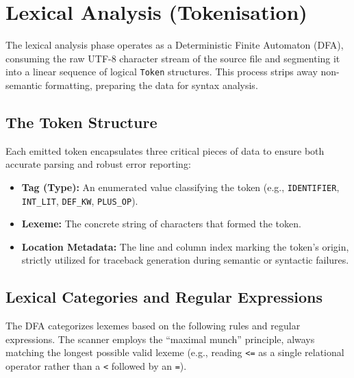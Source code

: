 \documentclass[11pt, a4paper]{article}
\begin{document}
\section{Lexical Analysis (Tokenisation)}

\noindent
The lexical analysis phase operates as a Deterministic Finite Automaton (DFA), consuming the raw UTF-8 character stream of the source file and segmenting it into a linear sequence of logical \texttt{Token} structures. This process strips away non-semantic formatting, preparing the data for syntax analysis.

\subsection{The Token Structure}

Each emitted token encapsulates three critical pieces of data to ensure both accurate parsing and robust error reporting:
\begin{itemize}
    \item \textbf{Tag (Type):} An enumerated value classifying the token (e.g., \texttt{IDENTIFIER}, \texttt{INT\_LIT}, \texttt{DEF\_KW}, \texttt{PLUS\_OP}).
    \item \textbf{Lexeme:} The concrete string of characters that formed the token.
    \item \textbf{Location Metadata:} The line and column index marking the token's origin, strictly utilized for traceback generation during semantic or syntactic failures.
\end{itemize}

\subsection{Lexical Categories and Regular Expressions}

The DFA categorizes lexemes based on the following rules and regular expressions. The scanner employs the ``maximal munch'' principle, always matching the longest possible valid lexeme (e.g., reading \texttt{<=} as a single relational operator rather than a \texttt{<} followed by an \texttt{=}).
\end{document}
